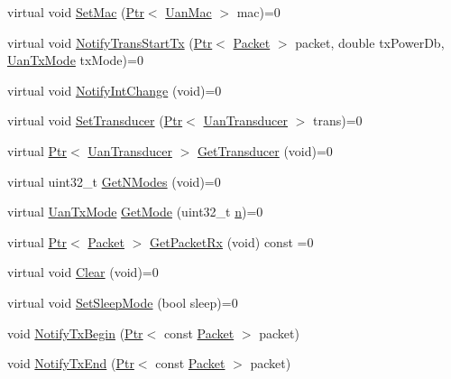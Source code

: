 \begin{DoxyCompactItemize}
\item 
virtual void \hyperlink{classns3_1_1UanPhy_ac8f7b4e4b5094cf12d01714878f86d68}{Set\+Mac} (\hyperlink{classns3_1_1Ptr}{Ptr}$<$ \hyperlink{classns3_1_1UanMac}{Uan\+Mac} $>$ mac)=0
\item 
virtual void \hyperlink{classns3_1_1UanPhy_a72ba3a61f0291e02c8f6a34ff04595c9}{Notify\+Trans\+Start\+Tx} (\hyperlink{classns3_1_1Ptr}{Ptr}$<$ \hyperlink{classns3_1_1Packet}{Packet} $>$ packet, double tx\+Power\+Db, \hyperlink{classns3_1_1UanTxMode}{Uan\+Tx\+Mode} tx\+Mode)=0
\item 
virtual void \hyperlink{classns3_1_1UanPhy_a0a05afc025e6dac38c20e246ebebbe45}{Notify\+Int\+Change} (void)=0
\item 
virtual void \hyperlink{classns3_1_1UanPhy_a4be883a5c677e395cff22d54cff5ada5}{Set\+Transducer} (\hyperlink{classns3_1_1Ptr}{Ptr}$<$ \hyperlink{classns3_1_1UanTransducer}{Uan\+Transducer} $>$ trans)=0
\item 
virtual \hyperlink{classns3_1_1Ptr}{Ptr}$<$ \hyperlink{classns3_1_1UanTransducer}{Uan\+Transducer} $>$ \hyperlink{classns3_1_1UanPhy_a5eb2d92144ef3e31be0bdf83fd50acd6}{Get\+Transducer} (void)=0
\item 
virtual uint32\+\_\+t \hyperlink{classns3_1_1UanPhy_ab97c29a4d6f91afe37bbca1fe64ceb07}{Get\+N\+Modes} (void)=0
\item 
virtual \hyperlink{classns3_1_1UanTxMode}{Uan\+Tx\+Mode} \hyperlink{classns3_1_1UanPhy_a7643e34b597d9710c56c562af9c57185}{Get\+Mode} (uint32\+\_\+t \hyperlink{lte__link__budget__x2__handover__measures_8m_abdb05bc5a064cf642a06c83b3392f148}{n})=0
\item 
virtual \hyperlink{classns3_1_1Ptr}{Ptr}$<$ \hyperlink{classns3_1_1Packet}{Packet} $>$ \hyperlink{classns3_1_1UanPhy_ada47d2c771bb86d664188bd638225fca}{Get\+Packet\+Rx} (void) const =0
\item 
virtual void \hyperlink{classns3_1_1UanPhy_a77cefc56b3980a5f23964ede417409c4}{Clear} (void)=0
\item 
virtual void \hyperlink{classns3_1_1UanPhy_afd97e812dcb14149bdac2af388db338a}{Set\+Sleep\+Mode} (bool sleep)=0
\item 
void \hyperlink{classns3_1_1UanPhy_af24e5c087b2a9f05d3cc8e946fbee90d}{Notify\+Tx\+Begin} (\hyperlink{classns3_1_1Ptr}{Ptr}$<$ const \hyperlink{classns3_1_1Packet}{Packet} $>$ packet)
\item 
void \hyperlink{classns3_1_1UanPhy_a58593421856c9b5fc1bc8fd9356da600}{Notify\+Tx\+End} (\hyperlink{classns3_1_1Ptr}{Ptr}$<$ const \hyperlink{classns3_1_1Packet}{Packet} $>$ packet)

\end{DoxyCompactItemize}
